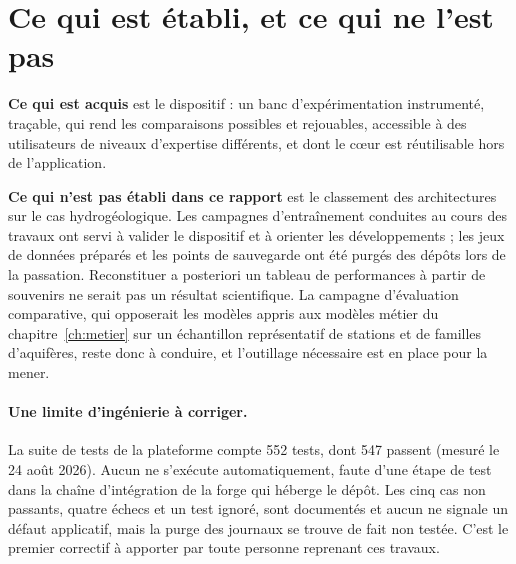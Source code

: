 \section{Ce qui est établi, et ce qui ne l'est pas}

\textbf{Ce qui est acquis} est le dispositif : un banc d'expérimentation instrumenté, traçable,
qui rend les comparaisons possibles et rejouables, accessible à des utilisateurs de niveaux
d'expertise différents, et dont le cœur est réutilisable hors de l'application.

\textbf{Ce qui n'est pas établi dans ce rapport} est le classement des architectures sur le cas
hydrogéologique. Les campagnes d'entraînement conduites au cours des travaux ont servi à
valider le dispositif et à orienter les développements ; les jeux de données préparés et les
points de sauvegarde ont été purgés des dépôts lors de la passation. Reconstituer a posteriori
un tableau de performances à partir de souvenirs ne serait pas un résultat scientifique. La
campagne d'évaluation comparative, qui opposerait les modèles appris aux modèles métier du
chapitre~\ref{ch:metier} sur un échantillon représentatif de stations et de familles
d'aquifères, reste donc à conduire, et l'outillage nécessaire est en place pour la mener.

\paragraph{Une limite d'ingénierie à corriger.} La suite de tests de la plateforme compte
\num{552} tests, dont \num{547} passent (mesuré le 24 août 2026). Aucun ne s'exécute
automatiquement, faute d'une étape de test dans la chaîne d'intégration de la forge qui héberge
le dépôt. Les cinq cas non passants, quatre échecs et un test ignoré, sont documentés et aucun ne
signale un défaut applicatif, mais la purge des journaux se trouve de fait non testée. C'est le premier correctif
à apporter par toute personne reprenant ces travaux.
